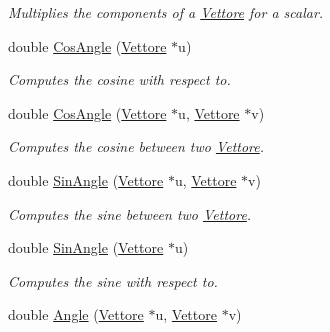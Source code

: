 \begin{DoxyCompactItemize}
\begin{DoxyCompactList}\small\item\em \-Multiplies the components of a \hyperlink{classVettore}{\-Vettore} for a scalar. \end{DoxyCompactList}\item 
double \hyperlink{classVettore_a907339d7b281d6d87abaea47a47bcd25}{\-Cos\-Angle} (\hyperlink{classVettore}{\-Vettore} $\ast$u)
\begin{DoxyCompactList}\small\item\em \-Computes the cosine with respect to. \end{DoxyCompactList}\item 
\hypertarget{classVettore_a72f38f80c8b2ea4b6dcd00d66ec24451}{double \hyperlink{classVettore_a72f38f80c8b2ea4b6dcd00d66ec24451}{\-Cos\-Angle} (\hyperlink{classVettore}{\-Vettore} $\ast$u, \hyperlink{classVettore}{\-Vettore} $\ast$v)}\label{classVettore_a72f38f80c8b2ea4b6dcd00d66ec24451}

\begin{DoxyCompactList}\small\item\em \-Computes the cosine between two \hyperlink{classVettore}{\-Vettore}. \end{DoxyCompactList}\item 
\hypertarget{classVettore_a8d84edbdf1f76b3065cc1c3291b98669}{double \hyperlink{classVettore_a8d84edbdf1f76b3065cc1c3291b98669}{\-Sin\-Angle} (\hyperlink{classVettore}{\-Vettore} $\ast$u, \hyperlink{classVettore}{\-Vettore} $\ast$v)}\label{classVettore_a8d84edbdf1f76b3065cc1c3291b98669}

\begin{DoxyCompactList}\small\item\em \-Computes the sine between two \hyperlink{classVettore}{\-Vettore}. \end{DoxyCompactList}\item 
double \hyperlink{classVettore_a46f89489dcb6933de9154c63c82f8b61}{\-Sin\-Angle} (\hyperlink{classVettore}{\-Vettore} $\ast$u)
\begin{DoxyCompactList}\small\item\em \-Computes the sine with respect to. \end{DoxyCompactList}\item 
\hypertarget{classVettore_a936e4b859237ce1643e932504dde2f22}{double \hyperlink{classVettore_a936e4b859237ce1643e932504dde2f22}{\-Angle} (\hyperlink{classVettore}{\-Vettore} $\ast$u, \hyperlink{classVettore}{\-Vettore} $\ast$v)}\label{classVettore_a936e4b859237ce1643e932504dde2f22}


\end{DoxyCompactItemize}
